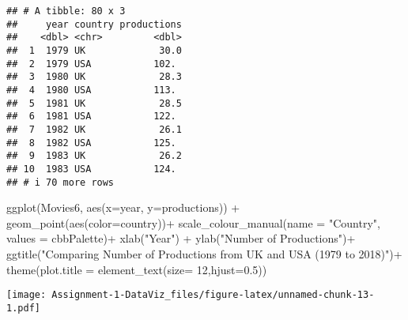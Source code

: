 \documentclass[
]{article}
\newenvironment{Shaded}{\begin{snugshade}}{\end{snugshade}}
\newcommand{\AttributeTok}[1]{\textcolor[rgb]{0.77,0.63,0.00}{#1}}
\newcommand{\CommentTok}[1]{\textcolor[rgb]{0.56,0.35,0.01}{\textit{#1}}}
\newcommand{\DecValTok}[1]{\textcolor[rgb]{0.00,0.00,0.81}{#1}}
\newcommand{\FloatTok}[1]{\textcolor[rgb]{0.00,0.00,0.81}{#1}}
\newcommand{\FunctionTok}[1]{\textcolor[rgb]{0.00,0.00,0.00}{#1}}
\newcommand{\NormalTok}[1]{#1}
\newcommand{\OtherTok}[1]{\textcolor[rgb]{0.56,0.35,0.01}{#1}}
\newcommand{\SpecialCharTok}[1]{\textcolor[rgb]{0.00,0.00,0.00}{#1}}
\newcommand{\StringTok}[1]{\textcolor[rgb]{0.31,0.60,0.02}{#1}}
\begin{document}
\begin{verbatim}
## # A tibble: 80 x 3
##     year country productions
##    <dbl> <chr>         <dbl>
##  1  1979 UK             30.0
##  2  1979 USA           102. 
##  3  1980 UK             28.3
##  4  1980 USA           113. 
##  5  1981 UK             28.5
##  6  1981 USA           122. 
##  7  1982 UK             26.1
##  8  1982 USA           125. 
##  9  1983 UK             26.2
## 10  1983 USA           124. 
## # i 70 more rows
\end{verbatim}

\begin{Shaded}
\begin{Highlighting}[]
\FunctionTok{ggplot}\NormalTok{(Movies6, }\FunctionTok{aes}\NormalTok{(}\AttributeTok{x=}\NormalTok{year, }\AttributeTok{y=}\NormalTok{productions)) }\SpecialCharTok{+} 
  \FunctionTok{geom\_point}\NormalTok{(}\FunctionTok{aes}\NormalTok{(}\AttributeTok{color=}\NormalTok{country))}\SpecialCharTok{+}
  \FunctionTok{scale\_colour\_manual}\NormalTok{(}\AttributeTok{name =} \StringTok{"Country"}\NormalTok{, }\AttributeTok{values =}\NormalTok{ cbbPalette)}\SpecialCharTok{+}
  \FunctionTok{xlab}\NormalTok{(}\StringTok{"Year"}\NormalTok{) }\SpecialCharTok{+} 
  \FunctionTok{ylab}\NormalTok{(}\StringTok{"Number of Productions"}\NormalTok{)}\SpecialCharTok{+}
  \FunctionTok{ggtitle}\NormalTok{(}\StringTok{"Comparing Number of Productions from UK and USA (1979 to 2018)"}\NormalTok{)}\SpecialCharTok{+}
  \FunctionTok{theme}\NormalTok{(}\AttributeTok{plot.title =} \FunctionTok{element\_text}\NormalTok{(}\AttributeTok{size=} \DecValTok{12}\NormalTok{,}\AttributeTok{hjust=}\FloatTok{0.5}\NormalTok{))}
\end{Highlighting}
\end{Shaded}

\texttt{[image: Assignment-1-DataViz\_files/figure-latex/unnamed-chunk-13-1.pdf]}

\begin{Shaded}
\end{Shaded}
\end{document}

